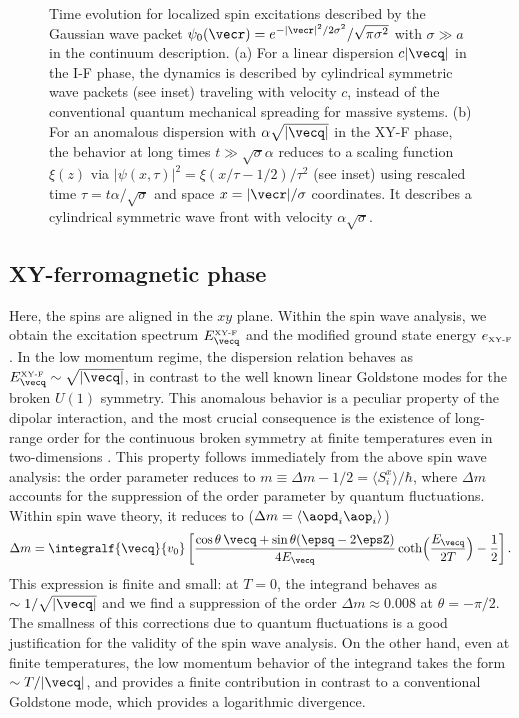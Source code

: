 \begin{figure}[ht]
    \centering
    \caption{ Time evolution for localized spin excitations described by the Gaussian wave packet $\psi_{0}({\vecr}) = e^{- |{\vecr}|^2/2\sigma^2}/\sqrt{\pi \sigma^2}$
  with $\sigma \gg a$ in the continuum description. (a) For a linear dispersion $c|{\vecq}|$ in the I-F phase, the dynamics is described by cylindrical symmetric wave packets (see inset) traveling
  with velocity $c$, instead of the conventional quantum mechanical spreading for massive systems.
  (b) For an anomalous dispersion with $\alpha \sqrt{|{\vecq}|}$ in the XY-F phase, the behavior at long times $t\gg\sqrt{\sigma} \alpha$ reduces to a
  scaling function $\xi(z)$ via $|\psi(x,\tau)|^2 = \xi(x/\tau -1/2)/\tau^2$ (see inset) using rescaled
  time $\tau = t \alpha /\sqrt{\sigma}$ and space $x = |{\vecr}|/\sigma$ coordinates. It describes a cylindrical symmetric wave front with velocity
  $\alpha \sqrt{\sigma}$.}
\end{figure}




\subsection{XY-ferromagnetic phase}
Here, the spins are aligned in the $xy$ plane.
 Within the spin wave analysis, we obtain the excitation spectrum
 $ E^{\mbox{\tiny{XY-F}}}_{\vecq}$ and the modified ground state energy
 $e_{\mbox{\tiny{XY-F}}}$.
In the low momentum regime, the dispersion relation behaves as $ E^{\mbox{\tiny XY-F}}_{\vecq} \sim \sqrt{|{\vecq}|}$, in contrast to the well
known linear Goldstone modes for the broken $U(1)$ symmetry.
This anomalous behavior is a peculiar property of the dipolar interaction, and the most crucial consequence
is the existence of long-range order for the continuous broken symmetry at finite temperatures
even in two-dimensions \cite{Bruno2001}.
This property follows immediately from the above spin wave analysis:
the order parameter reduces to $m \equiv \Delta m - 1/2=\langle S_{i}^{x}\rangle/\hbar $, where $\Delta m$ accounts for
the suppression of the order parameter by quantum fluctuations. Within spin wave theory, it reduces to ($\Delta m = \langle \aopd_i \aop_i\rangle$)
%
\begin{align}
    \Delta m = \integralf{\vecq}{v_0} \left[\frac{\cos \theta \, \vecq +\sin \theta ( \epsq-2 \epsZ)}{4 E_{\vecq} } \coth\!\Big(\frac{E_{\vecq}}{2T}\Big) - \frac{1}{2}\right] .
\end{align}
%
This expression is finite and small: at $T=0$, the integrand behaves as $\sim 1/\sqrt{|{\vecq}|}$ and we find a
suppression of the order $\Delta m \approx 0.008$ at $\theta= - \pi/2 $. The smallness of this corrections due to
quantum fluctuations is a good justification for the validity of the spin wave analysis. On the other hand,
even at finite temperatures, the low momentum behavior of the integrand takes the form $\sim T/|{\vecq}|$,
and provides a finite contribution in contrast to a conventional Goldstone mode, which provides a logarithmic divergence.


